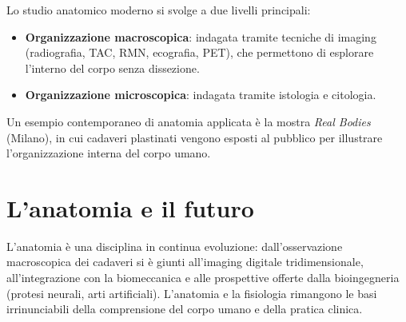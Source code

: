 Lo studio anatomico moderno si svolge a due livelli principali:

\begin{itemize}
  \item \textbf{Organizzazione macroscopica}: indagata tramite tecniche di imaging (radiografia, TAC, RMN, ecografia, PET), che permettono di esplorare l'interno del corpo senza dissezione.
  \item \textbf{Organizzazione microscopica}: indagata tramite istologia e citologia.
\end{itemize}

Un esempio contemporaneo di anatomia applicata è la mostra \textit{Real Bodies} (Milano), in cui cadaveri plastinati vengono esposti al pubblico per illustrare l'organizzazione interna del corpo umano.

\section{L'anatomia e il futuro}

L'anatomia è una disciplina in continua evoluzione: dall'osservazione macroscopica dei cadaveri si è giunti all'imaging digitale tridimensionale, all'integrazione con la biomeccanica e alle prospettive offerte dalla bioingegneria (protesi neurali, arti artificiali). L'anatomia e la fisiologia rimangono le basi irrinunciabili della comprensione del corpo umano e della pratica clinica.
